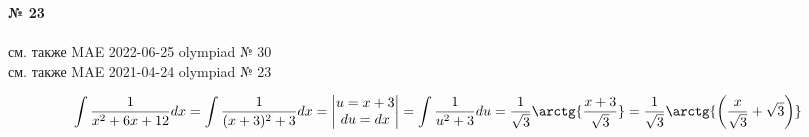 \documentclass{article}
\begin{document}
\textbf{№ 23} 
\\
\\ см. также {\color{red}MAE} 2022-06-25 olympiad № 30
\\ см. также {\color{red}MAE} 2021-04-24 olympiad № 23

$$ \int \frac{1}{x^2+6x+12} dx 
= \int \frac{1}{(x+3)^2+3} dx 
= \begin{vmatrix} u = x+3 \\
                 du = dx \end{vmatrix} 
= \int \frac{1}{u^2+3} du 
= \frac{1}{\sqrt{3}} \arctg{\frac{x+3}{\sqrt{3}}}
= \frac{1}{\sqrt{3}} \arctg{\left( \frac{x}{\sqrt{3}} + \sqrt{3} \right)} $$
\end{document}
